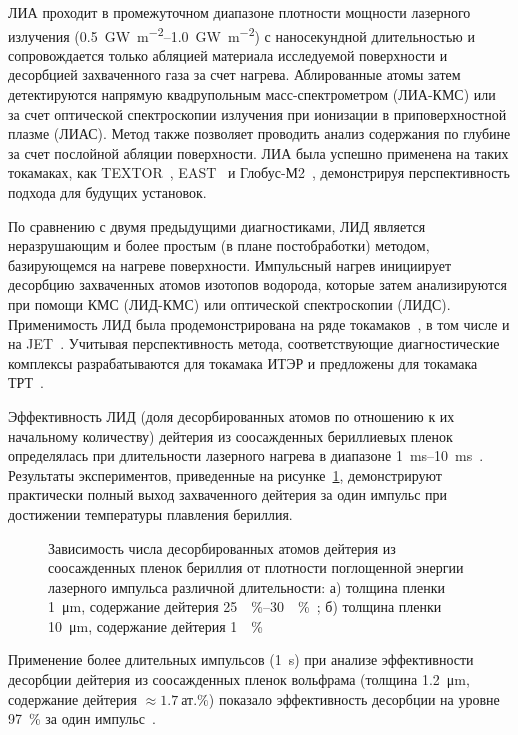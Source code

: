 ЛИА проходит в промежуточном диапазоне плотности мощности лазерного излучения (\SIrange{0.5}{1.0}{\giga\watt\per\meter\squared}) с наносекундной длительностью и сопровождается только абляцией материала исследуемой поверхности и десорбцией захваченного газа за счет нагрева. Аблированные атомы затем детектируются напрямую квадрупольным масс-спектрометром (ЛИА-КМС) или за счет оптической спектроскопии излучения при ионизации в приповерхностной плазме (ЛИАС). Метод также позволяет проводить анализ содержания по глубине за счет послойной абляции поверхности. ЛИА была успешно применена на таких токамаках, как TEXTOR~\cite{Gierse2016}, EAST~\cite{Hu2018} и Глобус-М2~\cite{Medvedev2024}, демонстрируя перспективность подхода для будущих установок. 

По сравнению с двумя предыдущими диагностиками, ЛИД является неразрушающим и более простым (в плане постобработки) методом, базирующемся на нагреве поверхности. Импульсный нагрев инициирует десорбцию захваченных атомов изотопов водорода, которые затем анализируются при помощи КМС (ЛИД-КМС) или оптической спектроскопии (ЛИДС). Применимость ЛИД была продемонстрирована на ряде токамаков~\cite{Schweer2009, Medvedev2024}, в том числе и на JET~\cite{Zlobinski2024}. Учитывая перспективность метода, соответствующие диагностические комплексы разрабатываются для токамака ИТЭР и предложены для токамака ТРТ~\cite{Razdobarin2022}. 

Эффективность ЛИД (доля десорбированных атомов по отношению к их начальному количеству) дейтерия из соосажденных бериллиевых пленок определялась при длительности лазерного нагрева в диапазоне \SIrange{1}{10}{\milli\second}~\cite{Zlobinski2019, Zlobinski2020}. Результаты экспериментов, приведенные на рисунке~\cref{fig:ch1/LID_efficiency}, демонстрируют практически полный выход захваченного дейтерия за один импульс при достижении температуры плавления бериллия. 
\begin{figure}[ht]
    \caption{Зависимость числа десорбированных атомов дейтерия из соосажденных пленок бериллия от плотности поглощенной энергии лазерного импульса различной длительности: а) толщина пленки \SI{1}{\micro\meter}, содержание дейтерия \SIrange{25}{30}{\percent}~\cite{Zlobinski2019}; б) толщина пленки \SI{10}{\micro\meter}, содержание дейтерия \SI{1}{\percent}~\cite{Zlobinski2020}}\label{fig:ch1/LID_efficiency}
\end{figure}
Применение более длительных импульсов (\SI{1}{\second}) при анализе эффективности десорбции дейтерия из соосажденных пленок вольфрама (толщина \SI{1.2}{\micro\meter}, содержание дейтерия \( \approx \SI{1.7}{\text{ат.}\percent} \)) показало эффективность десорбции на уровне \SI{97}{\percent} за один импульс~\cite{Yu2019}.

